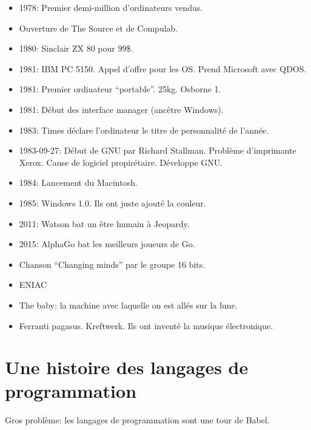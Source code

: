 \documentclass[a4paper,11pt]{article}
\begin{document}
\begin{itemize}
\item 1978: Premier demi-million d'ordinateurs vendus.

\item Ouverture de The Source et de Compulab.

\item 1980: Sinclair ZX 80 pour 99\$.

\item 1981: IBM PC 5150. Appel d'offre pour les OS. Prend Microsoft avec QDOS.

\item 1981: Premier ordinateur ``portable''. 25kg. Osborne 1.

\item 1981: Début des interface manager (ancêtre Windows).

\item 1983: Times déclare l'ordinateur le titre de personnalité de l'année.

\item 1983-09-27: Début de GNU par Richard Stallman. Problème d'imprimante Xerox.
  Cause de logiciel propirétaire. Développe GNU.

\item 1984: Lancement du Macintosh.

\item 1985: Windows 1.0. Ils ont juste ajouté la couleur.

\item 2011: Watson bat un être humain à Jeopardy.

\item 2015: AlphaGo bat les meilleurs joueurs de Go.

\item Chanson ``Changing minds'' par le groupe 16 bits.

\item ENIAC

\item The baby: la machine avec laquelle on est allés sur la lune.

\item Ferranti pagasus. Kreftwerk. Ils ont inventé la musique électronique.

\end{itemize}

\section{Une histoire des langages de programmation}

Gros problème: les langages de programmation sont une tour de Babel.
\end{document}
